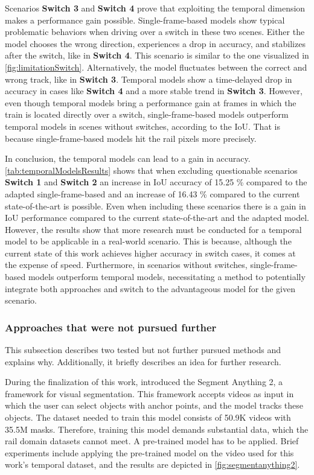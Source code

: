 Scenarios \textbf{Switch 3} and \textbf{Switch 4} prove that exploiting the temporal dimension makes a performance gain possible.
Single-frame-based models show typical problematic behaviors when driving over a switch in these two scenes.
Either the model chooses the wrong direction, experiences a drop in accuracy, and stabilizes after the switch, like in \textbf{Switch 4}.
This scenario is similar to the one visualized in \autoref{fig:limitationSwitch}.
Alternatively, the model fluctuates between the correct and wrong track, like in \textbf{Switch 3}.
Temporal models show a time-delayed drop in accuracy in cases like \textbf{Switch 4} and a more stable trend in \textbf{Switch 3}.
However, even though temporal models bring a performance gain at frames in which the train is located directly over a switch, single-frame-based models outperform temporal models in scenes without switches, according to the \ac{IoU}.
That is because single-frame-based models hit the rail pixels more precisely.

In conclusion, the temporal models can lead to a gain in accuracy.
\autoref{tab:temporalModelsResults} shows that when excluding questionable scenarios \textbf{Switch 1} and \textbf{Switch 2} an increase in \ac{IoU} accuracy of 15.25 \% compared to the adapted single-frame-based and an increase of 16.43 \% compared to the current state-of-the-art is possible.
Even when including these scenarios there is a gain in \ac{IoU} performance compared to the current state-of-the-art and the adapted model.
However, the results show that more research must be conducted for a temporal model to be applicable in a real-world scenario.
This is because, although the current state of this work achieves higher accuracy in switch cases, it comes at the expense of speed.
Furthermore, in scenarios without switches, single-frame-based models outperform temporal models, necessitating a method to potentially integrate both approaches and switch to the advantageous model for the given scenario.

\subsubsection{Approaches that were not pursued further}
\label{subsubsec:furtherApproachForOutlook}

This subsection describes two tested but not further pursued methods and explains why.
Additionally, it briefly describes an idea for further research.

During the finalization of this work, \cite{segmentAnything22024} introduced the Segment Anything 2, a framework for visual segmentation.
This framework accepts videos as input in which the user can select objects with anchor points, and the model tracks these objects.
The dataset needed to train this model consists of 50.9K videos with 35.5M masks.
Therefore, training this model demands substantial data, which the rail domain datasets cannot meet.
A pre-trained model has to be applied.
Brief experiments include applying the pre-trained model on the video used for this work's temporal dataset, and the results are depicted in \autoref{fig:segmentanything2}.

